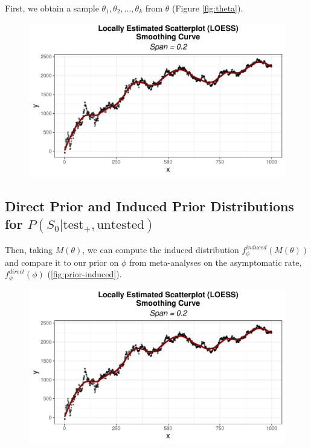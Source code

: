 \documentclass[12pt,twoside]{smiththesis}
\begin{document}
First, we obtain a sample \(\theta_1, \theta_2, \dots, \theta_k\) from \(\theta\) (Figure \ref{fig:theta}).
\begin{figure}[H]

{\centering \includegraphics{thesis_files/figure-latex/unnamed-chunk-17-1} 

}

\caption{\label{fig:theta}}\label{fig:unnamed-chunk-17}
\end{figure}
\hypertarget{direct-prior-and-induced-prior-distributions-for-ps_0texttest_textuntested}{%
\subsection{\texorpdfstring{Direct Prior and Induced Prior Distributions for \(P(S_0|\text{test}_+,\text{untested})\)}{Direct Prior and Induced Prior Distributions for P(S\_0\textbar\textbackslash text\{test\}\_+,\textbackslash text\{untested\})}}\label{direct-prior-and-induced-prior-distributions-for-ps_0texttest_textuntested}}

Then, taking \(M(\theta)\), we can compute the induced distribution \(f_\phi^{induced}(M(\theta))\) and compare it to our prior on \(\phi\) from meta-analyses on the asymptomatic rate, \(f_\phi^{direct}(\phi)\) (\ref{fig:prior-induced}).
\begin{figure}

{\centering \includegraphics{thesis_files/figure-latex/unnamed-chunk-18-1} 

}

\caption{\label{fig:prior-induced}}\label{fig:unnamed-chunk-18}
\end{figure}
\newpage
\end{document}
